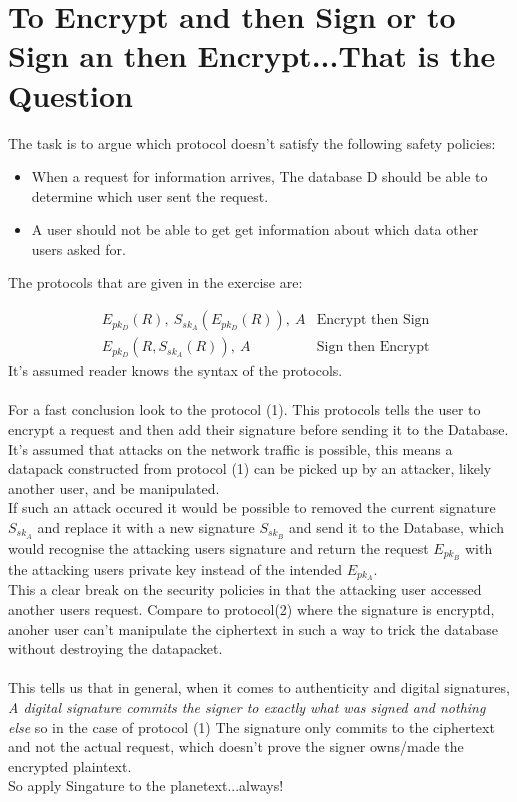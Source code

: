 \documentclass[12pt]{article}
\begin{document}
\section*{To Encrypt and then Sign  or to Sign an then Encrypt...That is the Question}
The task is to argue which protocol doesn't satisfy the following safety policies:
\begin{itemize}
    \item When a request for information arrives, The database D should be able to determine which user sent
the request.
    \item A user should not be able to get get information about which data other users asked for.
\end{itemize}
The protocols that are given in the exercise are:

\begin{align}
&E_{pk_D}(R),\: S_{sk_A}(E_{pk_D}(R)), \: A   &\text{Encrypt then Sign}\\
&E_{pk_D}(R, S_{sk_A}(R)), \: A                &\text{Sign then Encrypt}
\end{align}
It's assumed reader knows the syntax of the protocols.\\\\
\noindent For a fast conclusion look to the protocol (1). This protocols tells the user to encrypt a request and then add their signature before sending it to the Database. It's assumed that attacks on the network traffic is possible, this means a datapack constructed from protocol (1) can be picked up by an attacker, likely another user, and be manipulated.\\
If such an attack occured it would be possible to removed the current signature $S_{sk_A}$ and replace it with a new signature $S_{sk_B}$ and send it to the Database, which would recognise the attacking users signature and return the request $E_{pk_B}$ with the attacking users private key instead of the intended $E_{pk_A}$.\\
This a clear break on the security policies in that the attacking user accessed another users request. Compare to protocol(2) where the signature is encryptd, anoher user can't manipulate the ciphertext in such a way to trick the database without destroying the datapacket.\\\\
\noindent This tells us that in general, when it comes to authenticity and digital signatures, \textit{A digital signature commits the signer to exactly what was signed and nothing else} so in the case of protocol (1) The signature only commits to the ciphertext and not the actual request, which doesn't prove the signer owns/made the encrypted plaintext.\\
So apply Singature to the planetext...always!


\printbibliography
\end{document}
